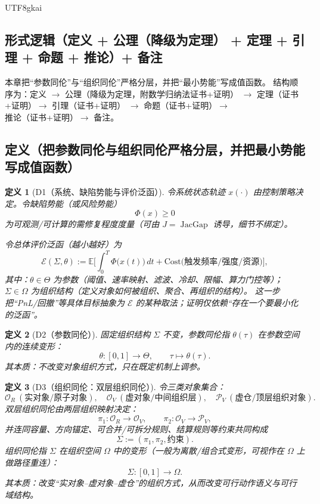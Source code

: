 \documentclass[12pt]{article}
\newtheorem{definition}{定义}[section]
\newcommand{\JacGap}{\operatorname{JacGap}}
\begin{document}
\begin{CJK*}{UTF8}{gkai}
\subsection{形式逻辑（定义 + 公理（降级为定理） + 定理 + 引理 + 命题 + 推论）+ 备注}
\label{subsec:tex28-ch7-logic-structure}

本章把“参数同伦”与“组织同伦”严格分层，并把“最小势能”写成值函数。
结构顺序为：定义 $\rightarrow$ 公理（降级为定理，附数学归纳法证书+证明）
$\rightarrow$ 定理（证书+证明）$\rightarrow$ 引理（证书+证明）
$\rightarrow$ 命题（证书+证明）$\rightarrow$ 推论（证书+证明）$\rightarrow$ 备注。

\subsection{定义（把参数同伦与组织同伦严格分层，并把最小势能写成值函数）}
\label{subsec:tex28-ch7-defs}

\begin{definition}[D1（系统、缺陷势能与评价泛函）]
\label{def:tex28-ch7-d1}
令系统状态轨迹 $x(\cdot)$ 由控制策略决定。令缺陷势能（或风险势能）
\[
  \Phi(x)\ge 0
\]
为可观测/可计算的需修复程度度量（可由 $J=\JacGap$ 诱导，细节不绑定）。

令总体评价泛函（越小越好）为
\[
  \mathcal{E}(\Sigma,\theta)
  :=\mathbb{E}\!\Big[\int_0^T \Phi\bigl(x(t)\bigr)\,dt
  +\mathrm{Cost}\bigl(\text{触发频率/强度/资源}\bigr)\Big],
\]
其中：$\theta\in\Theta$ 为参数（阈值、速率映射、滤波、冷却、限幅、算力门控等）；
$\Sigma\in\Omega$ 为组织结构（定义对象如何被组织、聚合、再组织的结构）。
这一步把“PnL/回撤”等具体目标抽象为 $\mathcal{E}$ 的某种取法；证明仅依赖“存在一个要最小化的泛函”。
\end{definition}

\begin{definition}[D2（参数同伦）]
\label{def:tex28-ch7-d2}
固定组织结构 $\Sigma$ 不变，参数同伦指 $\theta(\tau)$ 在参数空间内的连续变形：
\[
  \theta:[0,1]\to\Theta,\qquad \tau\mapsto\theta(\tau).
\]
其本质：不改变对象组织方式，只在既定机制上调参。
\end{definition}

\begin{definition}[D3（组织同伦：双层组织同伦）]
\label{def:tex28-ch7-d3}
令三类对象集合：
\[
  \mathcal{O}_R\ (\text{实对象/原子对象}),\quad
  \mathcal{O}_V\ (\text{虚对象/中间组织层}),\quad
  \mathcal{P}_V\ (\text{虚仓/顶层组织对象}).
\]
双层组织同伦由两层组织映射决定：
\[
  \pi_1:\mathcal{O}_R\to\mathcal{O}_V,\qquad
  \pi_2:\mathcal{O}_V\to\mathcal{P}_V,
\]
并连同容量、方向锚定、可合并/可拆分规则、结算规则等约束共同构成
\[
  \Sigma := (\pi_1,\pi_2,\text{约束}).
\]
组织同伦指 $\Sigma$ 在组织空间 $\Omega$ 中的变形（一般为离散/组合式变形，可视作在 $\Omega$ 上做路径重连）：
\[
  \Sigma:[0,1]\to\Omega.
\]
其本质：改变“实对象--虚对象--虚仓”的组织方式，从而改变可行动作语义与可行域结构。
\end{definition}


\end{CJK*}
\end{document}
